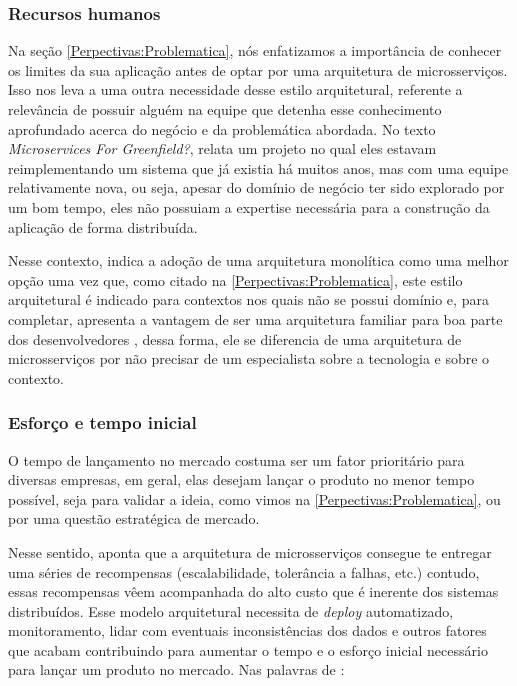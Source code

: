 \subsubsection{Recursos humanos}

Na seção \autoref{Perpectivas:Problematica}, nós enfatizamos a importância de conhecer os limites da
sua aplicação antes de optar por uma arquitetura de microsserviços. Isso nos leva a uma outra necessidade desse
estilo arquitetural, referente a relevância de possuir alguém na equipe que detenha esse conhecimento
aprofundado acerca do negócio e da problemática abordada. No texto \textit{Microservices For
Greenfield?},  relata um projeto no qual eles estavam reimplementando
um sistema que já existia há muitos anos, mas com uma equipe relativamente nova, ou seja, apesar do
domínio de negócio ter sido explorado por um bom tempo, eles não possuiam a expertise necessária
para a construção da aplicação de forma distribuída.

Nesse contexto,  indica a adoção de uma arquitetura monolítica como uma
melhor opção uma vez que, como citado na \autoref{Perpectivas:Problematica}, este estilo arquitetural
é indicado para contextos nos quais não se possui domínio e, para completar, apresenta a vantagem de ser uma
arquitetura familiar para boa parte dos desenvolvedores
\cite{Richards2020:FundamentalsOfSoftwareArchitecture}, dessa forma, ele se diferencia de uma
arquitetura de microsserviços por não precisar de um especialista sobre a tecnologia e sobre o contexto.


\subsubsection{Esforço e tempo inicial}

O tempo de lançamento no mercado costuma ser um fator prioritário para diversas empresas, em geral,
elas desejam lançar o produto no menor tempo possível, seja para validar a ideia, como
vimos na \autoref{Perpectivas:Problematica}, ou por uma questão estratégica de mercado.

Nesse sentido,  aponta que a arquitetura de
microsserviços consegue te entregar uma séries de recompensas (escalabilidade, tolerância a falhas,
etc.) contudo, essas recompensas vêem acompanhada do alto custo que é inerente dos sistemas distribuídos.
Esse modelo arquitetural necessita de \textit{deploy} automatizado, monitoramento, lidar com
eventuais inconsistências dos dados e outros fatores que acabam contribuindo para aumentar o tempo e o esforço
inicial necessário para lançar um produto no mercado. Nas palavras de
:

